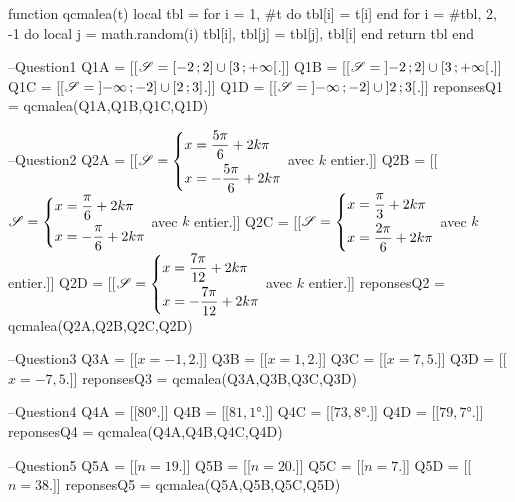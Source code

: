 \documentclass[a4paper,11pt]{article}
\author{Pierquet}
\title{\nomfichier}
\begin{document}
\pagestyle{fancy}

\thispagestyle{entetedsa}

\newcommand{\luac}[1]{\directlua{tex.sprint(#1)}}

\begin{luacode*}
function qcmalea(t)
	local tbl = {}
	for i = 1, #t do
		tbl[i] = t[i]
	end
	for i = #tbl, 2, -1 do
		local j = math.random(i)
		tbl[i], tbl[j] = tbl[j], tbl[i]
	end
	return tbl
end

--Question1
Q1A = [[$\mathscr{S}=\mbox{\ensuremath{\left[-2\mathpunct{};2\right]}} \cup \mbox{\ensuremath{\left[3\mathpunct{};+\infty\right[}}$.]]
Q1B = [[$\mathscr{S}=\mbox{\ensuremath{\left]-2\mathpunct{};2\right]}} \cup \mbox{\ensuremath{\left[3\mathpunct{};+\infty\right[}}$.]]
Q1C = [[$\mathscr{S}=\mbox{\ensuremath{\left]-\infty\mathpunct{};-2\right]}} \cup \mbox{\ensuremath{\left[2\mathpunct{};3\right]}}$.]]
Q1D = [[$\mathscr{S}=\mbox{\ensuremath{\left]-\infty\mathpunct{};-2\right]}} \cup \mbox{\ensuremath{\left]2\mathpunct{};3\right[}}$.]]
reponsesQ1 = qcmalea({Q1A,Q1B,Q1C,Q1D})

--Question2
Q2A = [[$\mathscr{S}=\begin{dcases} x = \dfrac{5\pi}{6}+2k\pi \\ x = -\dfrac{5\pi}{6}+2k\pi \end{dcases}$ avec $k$ entier.]]
Q2B = [[$\mathscr{S}=\begin{dcases} x = \dfrac{\pi}{6}+2k\pi \\ x = -\dfrac{\pi}{6}+2k\pi \end{dcases}$ avec $k$ entier.]]
Q2C = [[$\mathscr{S}=\begin{dcases} x = \dfrac{\pi}{3}+2k\pi \\ x = \dfrac{2\pi}{6}+2k\pi \end{dcases}$ avec $k$ entier.]]
Q2D = [[$\mathscr{S}=\begin{dcases} x = \dfrac{7\pi}{12}+2k\pi \\ x = -\dfrac{7\pi}{12}+2k\pi \end{dcases}$ avec $k$ entier.]]
reponsesQ2 = qcmalea({Q2A,Q2B,Q2C,Q2D})

--Question3
Q3A = [[$x=-1,2$.]]
Q3B = [[$x=1,2$.]]
Q3C = [[$x=7,5$.]]
Q3D = [[$x=-7,5$.]]
reponsesQ3 = qcmalea({Q3A,Q3B,Q3C,Q3D})

--Question4
Q4A = [[$80°$.]]
Q4B = [[$81,1°$.]]
Q4C = [[$73,8°$.]]
Q4D = [[$79,7°$.]]
reponsesQ4 = qcmalea({Q4A,Q4B,Q4C,Q4D})

--Question5
Q5A = [[$n=19$.]]
Q5B = [[$n=20$.]]
Q5C = [[$n=7$.]]
Q5D = [[$n=38$.]]
reponsesQ5 = qcmalea({Q5A,Q5B,Q5C,Q5D})
\end{luacode*}

\setcounter{numexos}{0}
\end{document}
